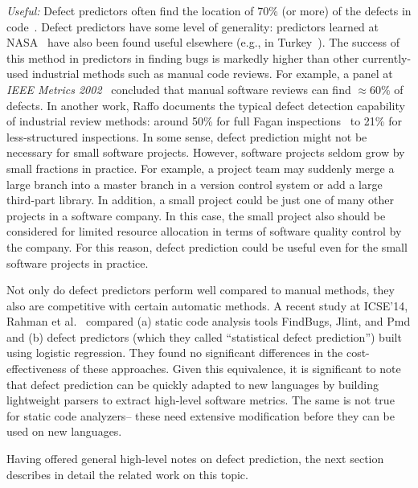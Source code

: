 {\em Useful:}
Defect predictors often  find the location of  70\% (or more)
of the defects in code~\cite{me07b}.
Defect predictors have some level of generality:
predictors learned at NASA~\cite{me07b} have also been found useful elsewhere
(e.g., in Turkey~\cite{tosun10,tosun09}).
The success of this method in  predictors in finding bugs is markedly
higher than other currently-used
industrial
methods such as manual code reviews. For example, 
a  panel at {\em IEEE Metrics
2002}~\cite{shu02} concluded that manual software  reviews can find ${\approx}60\%$ 
of defects.
In another work, 
Raffo documents the typical defect detection capability of
industrial review methods:   around 50\%
 for full Fagan inspections~\cite{fagan76} to
21\% for less-structured inspections.
In some sense, defect prediction might not be necessary for small software projects.
However, software projects seldom grow by small fractions in practice. For example, a project team may suddenly merge a large branch into a master branch in a version control system or add a large third-part library. In addition, a small project could be just one of many other projects in a software company. In this case, the small project also should be considered for limited resource allocation in terms of software quality control by the company. For this reason, defect prediction could be useful even for the small software projects in practice.

Not only do defect predictors perform well compared to manual methods,
they also are competitive with certain automatic methods.
A recent study at ICSE'14, Rahman et al.~\cite{rahman14:icse} compared
(a) static code analysis tools FindBugs, Jlint, and Pmd and (b) defect predictors
(which they called ``statistical defect prediction'') built using logistic regression.
They found  no significant differences in the cost-effectiveness
of these  approaches. Given this equivalence, it is significant to note that 
defect prediction can be quickly adapted to new languages by building lightweight
parsers to extract high-level software metrics. The same is not true for static code analyzers-- these need extensive modification before they can be used on new
languages.

Having offered general high-level notes on defect prediction,
the next section describes in detail the related work on this topic.
